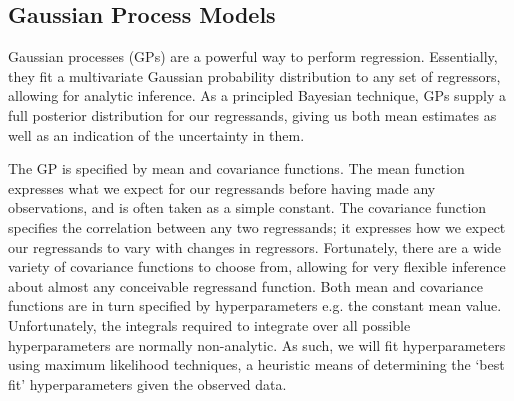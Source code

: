 \documentclass[journal]{IEEEtran}
\begin{document}


\subsection{Gaussian Process Models\label{sec:ngpm}}

Gaussian processes (GPs) \cite{GPsBook} are a powerful way to perform regression. Essentially, they fit a multivariate Gaussian probability distribution to any set of regressors, allowing for analytic inference. As a principled Bayesian technique, GPs supply a full posterior distribution for our regressands, giving us both mean estimates as well as an indication of the uncertainty in them.  

The GP is specified by mean and covariance functions. The mean function expresses what we expect for our regressands before having made any observations, and is often taken as a simple constant. The covariance function specifies the correlation between any two regressands; it expresses how we expect our regressands to vary with changes in regressors. Fortunately, there are a wide variety of covariance functions to choose from, allowing for very flexible inference about almost any conceivable regressand function. Both mean and covariance functions are in turn specified by hyperparameters e.g. the constant mean value. Unfortunately, the integrals required to integrate over all possible hyperparameters are normally non-analytic. As such, we will fit hyperparameters using maximum likelihood techniques, a heuristic means of determining the `best fit' hyperparameters given the observed data.  
\end{document}
